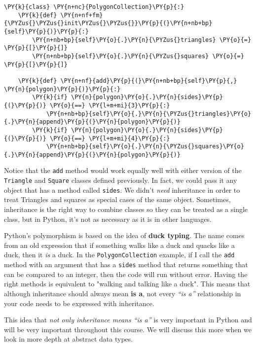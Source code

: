 \begin{Verbatim}[commandchars=\\\{\}]
\PY{k}{class} \PY{n+nc}{PolygonCollection}\PY{p}{:}
    \PY{k}{def} \PY{n+nf+fm}{\PYZus{}\PYZus{}init\PYZus{}\PYZus{}}\PY{p}{(}\PY{n+nb+bp}{self}\PY{p}{)}\PY{p}{:}
        \PY{n+nb+bp}{self}\PY{o}{.}\PY{n}{\PYZus{}triangles} \PY{o}{=} \PY{p}{[}\PY{p}{]}
        \PY{n+nb+bp}{self}\PY{o}{.}\PY{n}{\PYZus{}squares} \PY{o}{=} \PY{p}{[}\PY{p}{]}

    \PY{k}{def} \PY{n+nf}{add}\PY{p}{(}\PY{n+nb+bp}{self}\PY{p}{,} \PY{n}{polygon}\PY{p}{)}\PY{p}{:}
        \PY{k}{if} \PY{n}{polygon}\PY{o}{.}\PY{n}{sides}\PY{p}{(}\PY{p}{)} \PY{o}{==} \PY{l+m+mi}{3}\PY{p}{:}
            \PY{n+nb+bp}{self}\PY{o}{.}\PY{n}{\PYZus{}triangles}\PY{o}{.}\PY{n}{append}\PY{p}{(}\PY{n}{polygon}\PY{p}{)}
        \PY{k}{if} \PY{n}{polygon}\PY{o}{.}\PY{n}{sides}\PY{p}{(}\PY{p}{)} \PY{o}{==} \PY{l+m+mi}{4}\PY{p}{:}
            \PY{n+nb+bp}{self}\PY{o}{.}\PY{n}{\PYZus{}squares}\PY{o}{.}\PY{n}{append}\PY{p}{(}\PY{n}{polygon}\PY{p}{)}
\end{Verbatim}



Notice that the \texttt{add} method would work equally well with either version of the \texttt{Triangle} and \texttt{Square} classes defined previously.  In fact, we could pass it any object that has a method called \texttt{sides}.  We didn’t \emph{need} inheritance in order to treat Triangles and squares as special cases of the same object.  Sometimes, inheritance is the right way to combine classes so they can be treated as a single class, but in Python, it’s not as necessary as it is in other languages.


Python’s polymorphism is based on the idea of \textbf{duck typing}.  The name comes from an old expression that if something walks like a duck and quacks like a duck, then it \emph{is} a duck.  In the \texttt{PolygonCollection} example, if I call the \texttt{add} method with an argument that has a \texttt{sides} method that returns something that can be compared to an integer, then the code will run without error.  Having the right methods is equivalent to "walking and talking like a duck".  This means that although inheritance should always mean \textbf{is a}, not every \emph{“is a”} relationship in your code needs to be expressed with inheritance.  


This idea that \emph{not only inheritance means “is a”} is very important in Python and will be very important throughout this course.  We will discuss this more when we look in more depth at abstract data types.  


